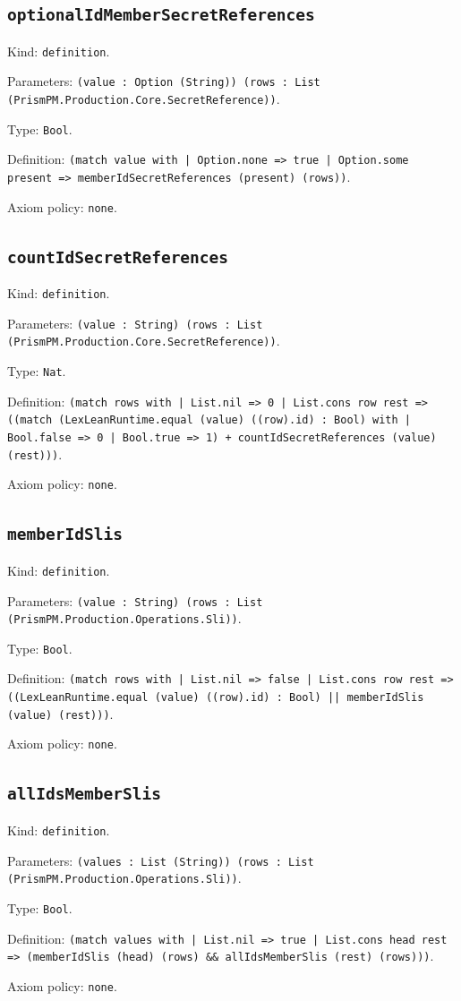 \documentclass[11pt]{article}
\begin{document}
\subsection*{\texttt{optionalIdMemberSecretReferences}}
\noindent Kind: \texttt{definition}.\par
\noindent Parameters: \texttt{(value : Option (String)) (rows : List (PrismPM.Production.Core.SecretReference))}.\par
\noindent Type: \texttt{Bool}.\par
\noindent Definition: \texttt{(match value with | Option.none => true | Option.some present => memberIdSecretReferences (present) (rows))}.\par
\noindent Axiom policy: \texttt{none}.\par
\subsection*{\texttt{countIdSecretReferences}}
\noindent Kind: \texttt{definition}.\par
\noindent Parameters: \texttt{(value : String) (rows : List (PrismPM.Production.Core.SecretReference))}.\par
\noindent Type: \texttt{Nat}.\par
\noindent Definition: \texttt{(match rows with | List.nil => 0 | List.cons row rest => ((match (LexLeanRuntime.equal (value) ((row).id) : Bool) with | Bool.false => 0 | Bool.true => 1) + countIdSecretReferences (value) (rest)))}.\par
\noindent Axiom policy: \texttt{none}.\par
\subsection*{\texttt{memberIdSlis}}
\noindent Kind: \texttt{definition}.\par
\noindent Parameters: \texttt{(value : String) (rows : List (PrismPM.Production.Operations.Sli))}.\par
\noindent Type: \texttt{Bool}.\par
\noindent Definition: \texttt{(match rows with | List.nil => false | List.cons row rest => ((LexLeanRuntime.equal (value) ((row).id) : Bool) || memberIdSlis (value) (rest)))}.\par
\noindent Axiom policy: \texttt{none}.\par
\subsection*{\texttt{allIdsMemberSlis}}
\noindent Kind: \texttt{definition}.\par
\noindent Parameters: \texttt{(values : List (String)) (rows : List (PrismPM.Production.Operations.Sli))}.\par
\noindent Type: \texttt{Bool}.\par
\noindent Definition: \texttt{(match values with | List.nil => true | List.cons head rest => (memberIdSlis (head) (rows) \&\& allIdsMemberSlis (rest) (rows)))}.\par
\noindent Axiom policy: \texttt{none}.\par
\end{document}
